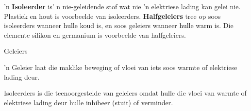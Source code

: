       \label{m38706*id66098}'n \textbf{Isoleerder} is' n nie-geleidende stof wat nie 'n elektriese lading kan gelei nie. Plastiek en hout is voorbeelde van isoleerders. \textbf{Halfgeleiers} tree op soos isoleerders wanneer hulle koud is, en soos geleiers wanneer hulle warm is. Die elemente silikon en germanium is voorbeelde van halfgeleiers.\par 
\Definition
{Geleiers} 
{'n Geleier laat die maklike beweging of vloei van iets soos warmte of elektriese lading deur.\par 
       } 
{Isoleerders is die teenoorgestelde van geleiers omdat hulle die vloei van warmte of elektriese lading deur hulle inhibeer (stuit) of verminder.\par}

